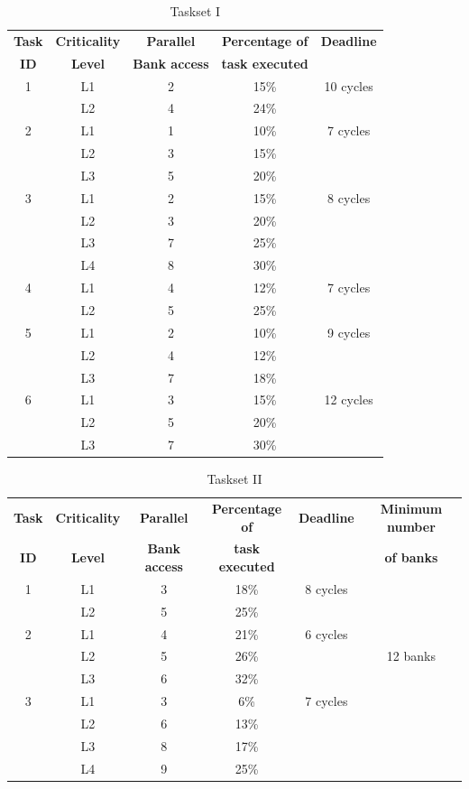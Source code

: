 \begin{table}[t]
\centering
  \begin{tabular}{|c|c|c|c|c|}\hline
  {\bf Task} & {\bf Criticality} & {\bf Parallel} & {\bf Percentage of} & {\bf Deadline} \\  
  {\bf ID} & {\bf Level} & {\bf Bank access} & {\bf task executed} &              \\ \hline
    1 & L1 & 2 & 15\% & 10 cycles \\
      & L2 & 4 & 24\% &  \\
    2 & L1 & 1 & 10\% & 7 cycles \\
      & L2 & 3 & 15\% &          \\
      & L3 & 5 & 20\% &          \\
    3 & L1 & 2 & 15\% & 8 cycles \\
      & L2 & 3 & 20\% &          \\
      & L3 & 7 & 25\% &          \\
      & L4 & 8 & 30\% &          \\
    4 & L1 & 4 & 12\% & 7 cycles \\
      & L2 & 5 & 25\% &          \\
    5 & L1 & 2 & 10\% & 9 cycles \\
      & L2 & 4 & 12\% &          \\
      & L3 & 7 & 18\% &          \\
    6 & L1 & 3 & 15\% & 12 cycles \\
      & L2 & 5 & 20\% &           \\
      & L3 & 7 & 30\% &           \\ \hline      
  \end{tabular}
 \caption{Taskset I}
 \end{table}

\begin{table}[t]
\centering
  \begin{tabular}{|c|c|c|c|c|c|}\hline
  {\bf Task} & {\bf Criticality} & {\bf Parallel} & {\bf Percentage of} & {\bf Deadline} & {\bf Minimum number}\\  
   {\bf ID} & {\bf Level} & {\bf Bank access} & {\bf task executed} &             & {\bf of banks}\\ \hline
    1 & L1 & 3 & 18\% & 8 cycles & \\
      & L2 & 5 & 25\% &          & \\
    2 & L1 & 4 & 21\% & 6 cycles & \\
      & L2 & 5 & 26\% &          & 12 banks \\
      & L3 & 6 & 32\% &          & \\
    3 & L1 & 3 & 6\% & 7 cycles & \\
      & L2 & 6 & 13\% &         & \\
      & L3 & 8 & 17\% &         & \\
      & L4 & 9 & 25\% &         & \\ \hline    
 \end{tabular}
 \caption{Taskset II}
\end{table}


